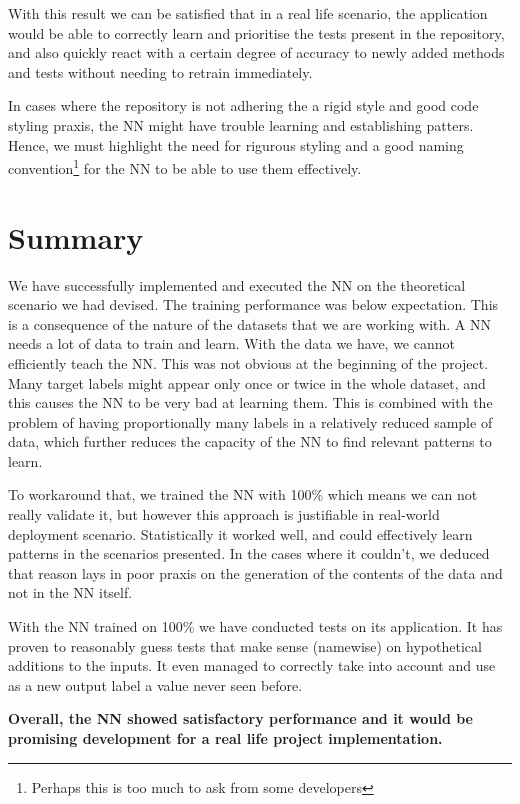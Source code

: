 \documentclass[a4paper, 11pt]{report}
\begin{document}
    With this result we can be satisfied that in a real life scenario, the application would be able to correctly learn and prioritise the tests present in the repository, and also quickly react with a certain degree of accuracy to newly added methods and tests without needing to retrain immediately.

    In cases where the repository is not adhering the a rigid style and good code styling praxis, the NN might have trouble learning and establishing patters. Hence, we must highlight the need for rigurous styling and a good naming convention\footnote{Perhaps this is too much to ask from some developers} for the NN to be able to use them effectively.

    \section{Summary}
    We have successfully implemented and executed the NN on the theoretical scenario we had devised. The training performance was below expectation. This is a consequence of the nature of the datasets that we are working with. A NN needs a lot of data to train and learn. With the data we have, we cannot efficiently teach the NN. This was not obvious at the beginning of the project. Many target labels might appear only once or twice in the whole dataset, and this causes the NN to be very bad at learning them. This is combined with the problem of having proportionally many labels in a relatively reduced sample of data, which further reduces the capacity of the NN to find relevant patterns to learn.

    To workaround that, we trained the NN with 100\% which means we can not really validate it, but however this approach is justifiable in real-world deployment scenario. Statistically it worked well, and could effectively learn patterns in the scenarios presented. In the cases where it couldn't, we deduced that reason lays in poor praxis on the generation of the contents of the data and not in the NN itself.

    With the NN trained on 100\% we have conducted tests on its application. It has proven to reasonably guess tests that make sense (namewise) on hypothetical additions to the inputs. It even managed to correctly take into account and use as a new output label a value never seen before.

    \textbf{Overall, the NN showed satisfactory performance and it would be promising development for a real life project implementation.}
\end{document}
